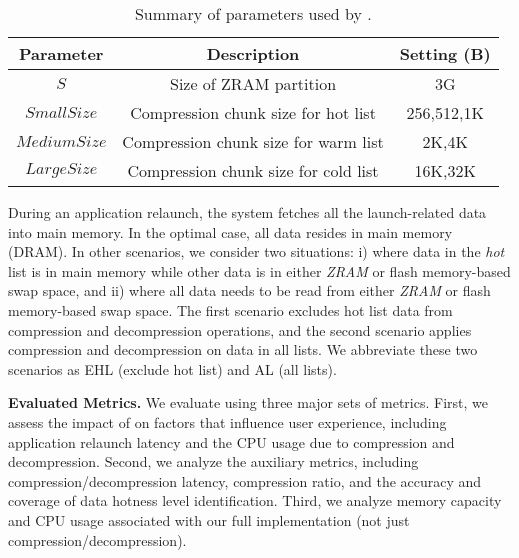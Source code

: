 \begin{table}[h!]
\vspace{0.5em}
\centering
\caption{Summary of parameters used by \proposal.}
\label{table:3}
\footnotesize
\begin{tabular}{c|c|c}
  \hline
  \textbf{Parameter}          & \textbf{ Description} & \textbf{Setting (B)} \\  \hline \hline
  $S$ & Size of ZRAM partition& 3G \\  \hline 
  $Small Size$ & Compression chunk size for hot list & 256,512,1K \\  \hline
  $Medium Size$ & Compression chunk size for warm list & 2K,4K \\  \hline
  $Large Size$ & Compression chunk size for cold list & 16K,32K \\  \hline
\end{tabular}
\end{table}

During an application relaunch, the system fetches all the launch-related data into main memory. In the optimal case, all data resides in main memory (DRAM). In other scenarios, we consider two situations: i) where data in the \emph{hot} list is in main memory while other data is in either \emph{ZRAM} or flash memory-based swap space, and ii) where all data needs to be read from either \emph{ZRAM} or flash memory-based swap space. The first scenario excludes hot list data from compression and decompression operations, and the second scenario applies compression and decompression on data in all lists. We abbreviate these two scenarios as EHL (exclude hot list) and AL (all lists).




\noindent\textbf{Evaluated Metrics.}
We evaluate \proposal using three major sets of metrics.
First, we assess the impact of \proposal on factors that influence user experience, including application relaunch latency and the CPU usage due to compression and decompression.
Second, we analyze the auxiliary metrics, including compression/decompression latency, compression ratio, and the accuracy and coverage of data hotness level identification.
Third, we analyze memory capacity and CPU usage associated with our full \proposal implementation (not just compression/decompression).